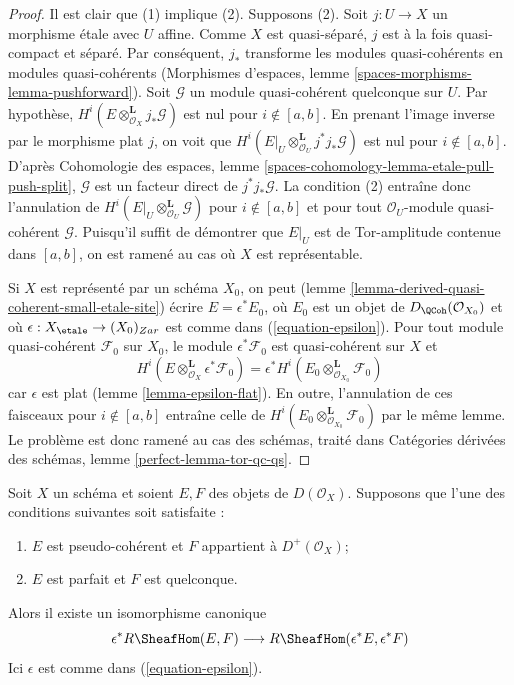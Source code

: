 \begin{proof}
Il est clair que (1) implique (2). Supposons (2). Soit $j : U \to X$ un
morphisme \'etale avec $U$ affine. Comme $X$ est quasi-s\'epar\'e, $j$ est \`a
la fois quasi-compact et s\'epar\'e. Par cons\'equent, $j_*$ transforme les
modules quasi-coh\'erents en modules quasi-coh\'erents (Morphismes d'espaces,
lemme
\ref{spaces-morphisms-lemma-pushforward}).
Soit $\mathcal{G}$ un module quasi-coh\'erent quelconque sur $U$.
Par hypoth\`ese,
$H^i(E \otimes_{\mathcal{O}_X}^\mathbf{L} j_*\mathcal{G})$ est nul pour
$i \notin [a,b]$. En prenant l'image inverse par le morphisme plat $j$, on
voit que
$H^i(E|_U \otimes_{\mathcal{O}_U}^\mathbf{L} j^*j_*\mathcal{G})$ est nul
pour $i \notin [a,b]$. D'apr\`es Cohomologie des espaces, lemme
\ref{spaces-cohomology-lemma-etale-pull-push-split}, $\mathcal{G}$ est un
facteur direct de $j^*j_*\mathcal{G}$. La condition (2) entra\^ine donc
l'annulation de
$H^i(E|_U \otimes_{\mathcal{O}_U}^\mathbf{L} \mathcal{G})$
pour $i \notin [a,b]$ et pour tout $\mathcal{O}_U$-module quasi-coh\'erent
$\mathcal{G}$. Puisqu'il suffit de d\'emontrer que $E|_U$ est de Tor-amplitude
contenue dans $[a,b]$, on est ramen\'e au cas o\`u $X$ est repr\'esentable.

\medskip\noindent
Si $X$ est repr\'esent\'e par un sch\'ema $X_0$, on peut (lemme
\ref{lemma-derived-quasi-coherent-small-etale-site}) \'ecrire
$E=\epsilon^*E_0$, o\`u $E_0$ est un objet de
$D_\QCoh(\mathcal{O}_{X_0})$ et o\`u
$\epsilon : X_\etale \to (X_0)_{Zar}$ est comme dans
(\ref{equation-epsilon}). Pour tout module quasi-coh\'erent
$\mathcal{F}_0$ sur $X_0$, le module $\epsilon^*\mathcal{F}_0$ est
quasi-coh\'erent sur $X$ et
$$
H^i(E \otimes_{\mathcal{O}_X}^\mathbf{L} \epsilon^*\mathcal{F}_0)
=
\epsilon^*H^i(E_0 \otimes_{\mathcal{O}_{X_0}}^\mathbf{L} \mathcal{F}_0)
$$
car $\epsilon$ est plat (lemme \ref{lemma-epsilon-flat}). En outre,
l'annulation de ces faisceaux pour $i \notin [a,b]$ entra\^ine celle de
$H^i(E_0 \otimes_{\mathcal{O}_{X_0}}^\mathbf{L} \mathcal{F}_0)$
par le m\^eme lemme. Le probl\`eme est donc ramen\'e au cas des sch\'emas,
trait\'e dans Cat\'egories d\'eriv\'ees des sch\'emas, lemme
\ref{perfect-lemma-tor-qc-qs}.
\end{proof}

\begin{lemma}
\label{lemma-descend-RHom}
Soit $X$ un sch\'ema et soient $E,F$ des objets de $D(\mathcal{O}_X)$.
Supposons que l'une des conditions suivantes soit satisfaite :
\begin{enumerate}
\item $E$ est pseudo-coh\'erent et $F$ appartient \`a
$D^+(\mathcal{O}_X)$;
\item $E$ est parfait et $F$ est quelconque.
\end{enumerate}
Alors il existe un isomorphisme canonique
$$
\epsilon^*R\SheafHom(E, F) \longrightarrow R\SheafHom(\epsilon^*E, \epsilon^*F)
$$
Ici $\epsilon$ est comme dans (\ref{equation-epsilon}).
\end{lemma}

